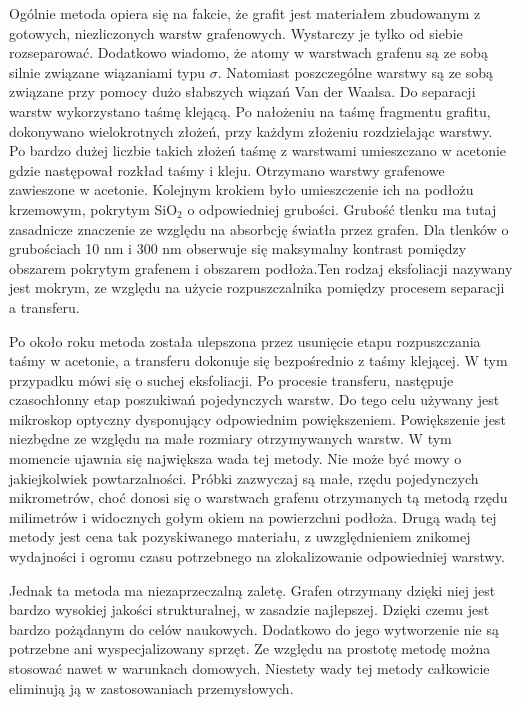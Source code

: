	Ogólnie metoda opiera się na fakcie, że grafit jest materiałem zbudowanym z gotowych, niezliczonych warstw 
	grafenowych. Wystarczy je tylko od siebie rozseparować. Dodatkowo wiadomo, że atomy w warstwach grafenu 
	są ze sobą silnie związane wiązaniami typu $\sigma$. Natomiast poszczególne warstwy są ze sobą związane 
	przy pomocy dużo słabszych wiązań Van der Waalsa. 
	Do separacji warstw wykorzystano taśmę klejącą. Po nałożeniu na taśmę fragmentu grafitu, dokonywano wielokrotnych
	złożeń, przy każdym złożeniu rozdzielając warstwy. Po bardzo dużej liczbie takich złożeń taśmę z warstwami 
	umieszczano w acetonie gdzie następował rozkład taśmy i kleju. Otrzymano warstwy grafenowe zawieszone w acetonie.
	Kolejnym krokiem było umieszczenie ich na podłożu krzemowym, pokrytym SiO$_2$ o odpowiedniej grubości.
	Grubość tlenku ma tutaj zasadnicze znaczenie ze względu na absorbcję światła przez grafen. Dla tlenków
	o grubościach 10 nm i 300 nm obserwuje się maksymalny kontrast pomiędzy obszarem pokrytym grafenem i obszarem 	
	podłoża.Ten rodzaj eksfoliacji nazywany jest mokrym, ze względu na użycie rozpuszczalnika pomiędzy procesem 
	separacji a transferu.

	Po około roku metoda została ulepszona przez usunięcie etapu rozpuszczania taśmy w acetonie, a transferu 
	dokonuje się bezpośrednio z taśmy klejącej. W tym przypadku mówi się o suchej eksfoliacji.
	Po procesie transferu, następuje czasochłonny etap poszukiwań pojedynczych warstw. Do tego celu używany jest
	mikroskop optyczny dysponujący odpowiednim powiększeniem. Powiększenie jest niezbędne ze względu na małe 
	rozmiary otrzymywanych warstw. W tym momencie ujawnia się największa wada tej metody. Nie może być mowy
	o jakiejkolwiek powtarzalności. Próbki zazwyczaj są małe, rzędu pojedynczych mikrometrów, choć donosi się
	o warstwach grafenu otrzymanych tą metodą rzędu milimetrów i widocznych gołym okiem na powierzchni podłoża.
	Drugą wadą tej metody jest cena tak pozyskiwanego materiału, z uwzględnieniem znikomej wydajności i 
	ogromu czasu potrzebnego na zlokalizowanie odpowiedniej warstwy.

	Jednak ta metoda ma niezaprzeczalną zaletę. Grafen otrzymany dzięki niej jest bardzo wysokiej jakości 
	strukturalnej, w zasadzie najlepszej. Dzięki czemu jest bardzo pożądanym do celów naukowych. 
	Dodatkowo do jego wytworzenie nie są potrzebne ani wyspecjalizowany sprzęt. Ze względu na prostotę
	metodę można stosować nawet w warunkach domowych.
	Niestety wady tej metody całkowicie eliminują ją w zastosowaniach przemysłowych.

